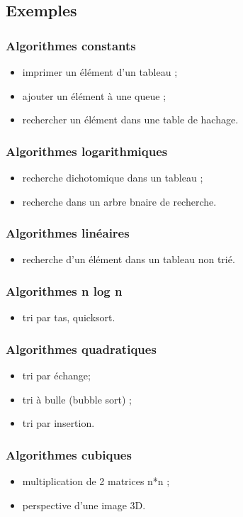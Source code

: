\subsection{Exemples}
\subsubsection{Algorithmes constants}
\begin{itemize}
\item imprimer un élément d'un tableau ;
\item ajouter un élément à une queue ;
\item rechercher un élément dans une table de hachage.
\end{itemize}
\subsubsection{Algorithmes logarithmiques}
\begin{itemize}
\item recherche dichotomique dans un tableau ;
\item recherche dans un arbre bnaire de recherche.
\end{itemize}
\subsubsection{Algorithmes linéaires}
\begin{itemize}
\item recherche d'un élément dans un tableau non trié.
\end{itemize}
\subsubsection{Algorithmes n log n}
\begin{itemize}
\item tri par tas, quicksort.
\end{itemize}
\subsubsection{Algorithmes quadratiques}
\begin{itemize}
\item tri par échange;
\item tri à bulle (bubble sort) ;
\item tri par insertion.
\end{itemize}
\subsubsection{Algorithmes cubiques}
\begin{itemize}
\item multiplication de 2 matrices n*n ;
\item perspective d'une image 3D.
\end{itemize}
